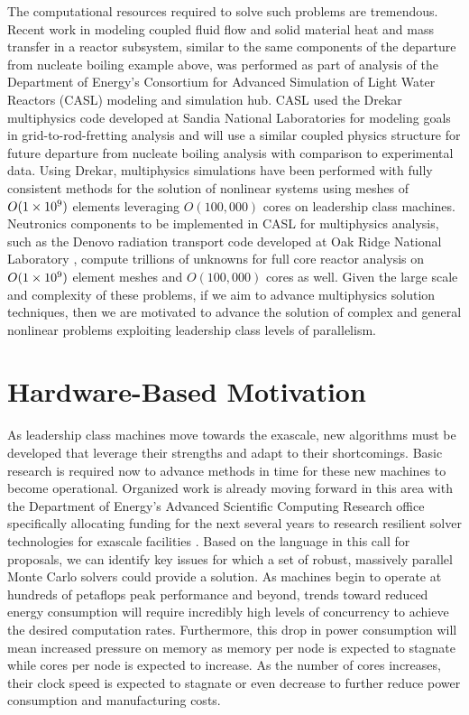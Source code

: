 The computational resources required to solve such problems are
tremendous. Recent work in modeling coupled fluid flow and solid
material heat and mass transfer in a reactor subsystem, similar to the
same components of the departure from nucleate boiling example above,
was performed as part of analysis of the Department of Energy's
Consortium for Advanced Simulation of Light Water Reactors (CASL)
modeling and simulation hub. CASL used the Drekar multiphysics code
developed at Sandia National Laboratories
\citep{pawlowski_drekar_2012} for modeling goals in
grid-to-rod-fretting analysis and will use a similar coupled physics
structure for future departure from nucleate boiling analysis with
comparison to experimental data. Using Drekar, multiphysics
simulations have been performed with fully consistent methods for the
solution of nonlinear systems using meshes of $O(1\times 10^{9})$ elements
leveraging $O(100,000)$ cores on leadership class machines. Neutronics
components to be implemented in CASL for multiphysics analysis, such
as the Denovo radiation transport code developed at Oak Ridge National
Laboratory \citep{evans_denovo:_2010}, compute trillions of unknowns
for full core reactor analysis on $O(1\times 10^{9})$ element meshes and
$O(100,000)$ cores as well. Given the large scale and complexity of
these problems, if we aim to advance multiphysics solution techniques,
then we are motivated to advance the solution of complex and general
nonlinear problems exploiting leadership class levels of parallelism.

\section{Hardware-Based Motivation}
\label{sec:hardware_motivation}
As leadership class machines move towards the exascale, new algorithms
must be developed that leverage their strengths and adapt to their
shortcomings. Basic research is required now to advance methods in
time for these new machines to become operational. Organized work is
already moving forward in this area with the Department of Energy's
Advanced Scientific Computing Research office specifically allocating
funding for the next several years to research resilient solver
technologies for exascale facilities
\citep{u.s._department_of_energy_resilient_2012}. Based on the
language in this call for proposals, we can identify key issues for
which a set of robust, massively parallel Monte Carlo solvers could
provide a solution. As machines begin to operate at hundreds of
petaflops peak performance and beyond, trends toward reduced energy
consumption will require incredibly high levels of concurrency to
achieve the desired computation rates. Furthermore, this drop in
power consumption will mean increased pressure on memory as memory per
node is expected to stagnate while cores per node is expected to
increase. As the number of cores increases, their clock speed is
expected to stagnate or even decrease to further reduce power
consumption and manufacturing costs.

